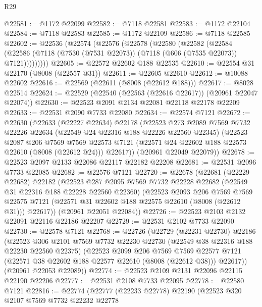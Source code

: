 \begin{lexlean}{R29}
\begin{coremodule}
@22581 := @1172 @22099
@22582 := @7118 @22581
@22583 := @1172 @22104
@22584 := @7118 @22583
@22585 := @1172 @22109
@22586 := @7118 @22585
@22602 := @22536
    (@22574
      (@22576
        (@22578
          (@22580
            (@22582
              (@22584
                (@22586 (@7118 (@7530 (@7531 @22073)) (@7118 (@606 (@7535 @22073)) @7121)))))))))
@22605 := @22572 @22602 @188 @22535
@22610 := @22554 @31 @22170 (@8008 (@22557 @31))
@22611 := @22605 @22610
@22612 := @10088 @22602
@22616 := @22569 (@22611 (@8008 (@22612 @188)))
@22617 := @8028 @22514
@22624 := @22529 (@22540 (@22563 (@22616 @22617)) (@20961 @22047 @22074))
@22630 := @22523 @2091 @2134 @22081 @22118 @22178 @22209
@22633 := @22531 @2090 @7733 @22080
@22634 := @22574 @7121
@22672 := @22630
    (@22633
      (@22227 @22634)
      @22178
      (@22523
        @273
        @2089
        @7569
        @7732
        @22226
        @22634
        (@22549 @24 @22316 @188 @22226 @22560 @22345)
        (@22523
          @2087
          @206
          @7569
          @7569
          @22573
          @7121
          (@22571 @24 @22602 @188 @22573 @22610 (@8008 (@22612 @24)))
          @22617))
      (@20961 @22049 @22079))
@22678 := @22523 @2097 @2133 @22086 @22117 @22182 @22208
@22681 := @22531 @2096 @7733 @22085
@22682 := @22576 @7121
@22720 := @22678
    (@22681
      (@22229 @22682)
      @22182
      (@22523
        @287
        @2095
        @7569
        @7732
        @22228
        @22682
        (@22549 @31 @22316 @188 @22228 @22560 @22360)
        (@22523
          @2093
          @206
          @7569
          @7569
          @22575
          @7121
          (@22571 @31 @22602 @188 @22575 @22610 (@8008 (@22612 @31)))
          @22617))
      (@20961 @22051 @22084))
@22726 := @22523 @2103 @2132 @22091 @22116 @22186 @22207
@22729 := @22531 @2102 @7733 @22090
@22730 := @22578 @7121
@22768 := @22726
    (@22729
      (@22231 @22730)
      @22186
      (@22523
        @306
        @2101
        @7569
        @7732
        @22230
        @22730
        (@22549 @38 @22316 @188 @22230 @22560 @22375)
        (@22523
          @2099
          @206
          @7569
          @7569
          @22577
          @7121
          (@22571 @38 @22602 @188 @22577 @22610 (@8008 (@22612 @38)))
          @22617))
      (@20961 @22053 @22089))
@22774 := @22523 @2109 @2131 @22096 @22115 @22190 @22206
@22777 := @22531 @2108 @7733 @22095
@22778 := @22580 @7121
@22816 := @22774
    (@22777
      (@22233 @22778)
      @22190
      (@22523
        @320
        @2107
        @7569
        @7732
        @22232
        @22778

\end{coremodule}
\end{lexlean}
